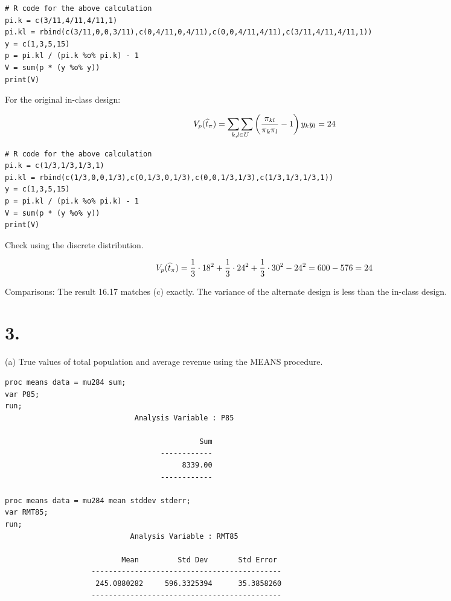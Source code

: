 \documentclass[12pt]{article}
\begin{document}
\begin{verbatim}
# R code for the above calculation
pi.k = c(3/11,4/11,4/11,1)
pi.kl = rbind(c(3/11,0,0,3/11),c(0,4/11,0,4/11),c(0,0,4/11,4/11),c(3/11,4/11,4/11,1))
y = c(1,3,5,15)
p = pi.kl / (pi.k %o% pi.k) - 1
V = sum(p * (y %o% y))
print(V)
\end{verbatim}

For the original in-class design:

\[
V_p(\widehat t_\pi)=\underset{k,l\in U}{\sum\sum}
\left({\pi_{kl}\over\pi_k\pi_l}-1\right)y_ky_l=24
\]

\begin{verbatim}
# R code for the above calculation
pi.k = c(1/3,1/3,1/3,1)
pi.kl = rbind(c(1/3,0,0,1/3),c(0,1/3,0,1/3),c(0,0,1/3,1/3),c(1/3,1/3,1/3,1))
y = c(1,3,5,15)
p = pi.kl / (pi.k %o% pi.k) - 1
V = sum(p * (y %o% y))
print(V)
\end{verbatim}

Check using the discrete distribution.

\[
V_p(\widehat t_\pi)=
{1\over3}\cdot18^2+{1\over3}\cdot24^2+{1\over3}\cdot30^2
-24^2=600-576=24
\]

Comparisons:
The result 16.17 matches (c) exactly.
The variance of the alternate design is less than
the in-class design.


\section*{3.}
(a) True values of total population and average revenue using the MEANS procedure.
\begin{verbatim}
proc means data = mu284 sum;
var P85;
run;                                    
                              Analysis Variable : P85

                                             Sum
                                    ------------
                                         8339.00
                                    ------------

proc means data = mu284 mean stddev stderr;
var RMT85;
run;                           
                             Analysis Variable : RMT85
                             
                           Mean         Std Dev       Std Error
                    --------------------------------------------
                     245.0880282     596.3325394      35.3858260
                    --------------------------------------------
\end{verbatim}
\end{document}
